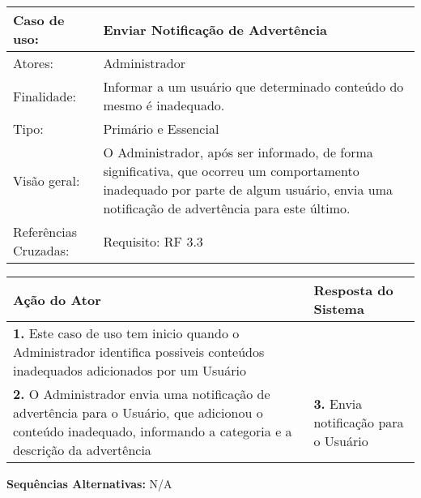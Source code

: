 \documentclass[12pt,a4paper,onecolumn,titlepage]{article}
\begin{document}
\begin{table}[h!]
\begin{center}
\begin{tabular}{p{2.5cm} p{9.5cm}}
Caso de uso: & \textbf{Enviar Notificação de Advertência} \\ \hline
Atores: & Administrador \\ \hline
Finalidade: & Informar a um usuário que determinado conteúdo do mesmo é inadequado.\\ \hline
Tipo: & Primário e Essencial \\ \hline
Visão geral: & O Administrador, após ser informado, de forma significativa, que ocorreu um comportamento inadequado por parte de algum usuário, envia uma notificação de advertência para este último. \\ \hline
Referências Cruzadas: & Requisito: RF 3.3\\ 

\end{tabular}
\end{center}
\end{table}

\begin{center}
\def\arraystretch{1.1}
\begin{tabular}{|p{6cm}|p{6cm}|}

\hline
\textbf{Ação do Ator} & \textbf{Resposta do Sistema} \\ \hline
\textbf{1.} Este caso de uso tem inicio quando o Administrador identifica possiveis conteúdos inadequados adicionados por um Usuário  & \\ \hline
\textbf{2.} O Administrador envia uma notificação de advertência para o Usuário, que adicionou o conteúdo inadequado, informando a categoria e a descrição da advertência  & \textbf{3.} Envia notificação para o Usuário \\ \hline
\end{tabular}
\end{center}

\textbf{Sequências Alternativas:} N/A

\newpage
\end{document}
